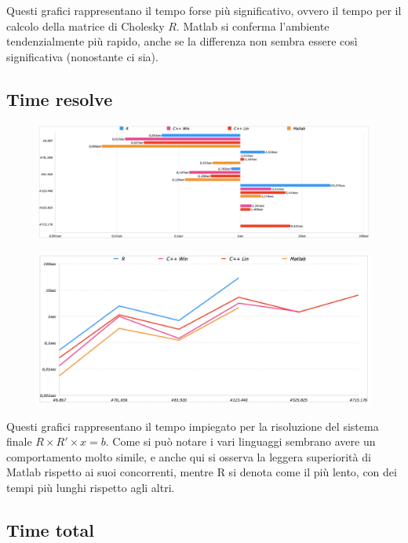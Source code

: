 \documentclass[preprint,12pt]{elsarticle}
\begin{document}
Questi grafici rappresentano il tempo forse più significativo, ovvero il tempo per il calcolo della matrice di Cholesky $R$.
Matlab si conferma l'ambiente tendenzialmente più rapido, anche se la differenza non sembra essere così significativa (nonostante ci sia).

\subsection*{Time resolve}

\begin{figure}[H]
	\centering
	\includegraphics[width=\linewidth]{solving1}
\end{figure}

\begin{figure}[H]
	\centering
	\includegraphics[width=\linewidth]{solving2}
\end{figure}

Questi grafici rappresentano il tempo impiegato per la risoluzione del sistema finale $R \times R' \times x = b$.
Come si può notare i vari linguaggi sembrano avere un comportamento molto simile, e anche qui si osserva la leggera superiorità di Matlab rispetto ai suoi concorrenti, mentre R si denota come il più lento, con dei tempi più lunghi rispetto agli altri.

\subsection*{Time total}
\end{document}
